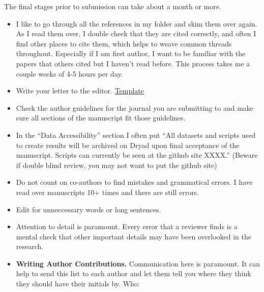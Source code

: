 \documentclass[
  letterpaper,
  DIV=11,
  numbers=noendperiod]{scrreprt}
\begin{document}

The final stages prior to submission can take about a month or more.

\begin{itemize}
\item
  I like to go through all the references in my folder and skim them
  over again. As I read them over, I double check that they are cited
  correctly, and often I find other places to cite them, which helps to
  weave common threads throughout. Especially if I am first author, I
  want to be familiar with the papers that others cited but I haven't
  read before. This process takes me a couple weeks of 4-5 hours per
  day.
\item
  Write your letter to the editor.
  \href{https://docs.google.com/document/d/1ye4hs0gYP4l4m27o9V_nPZqXD-EPNBrm9UWj-vBv_Zw/edit}{Template}
\item
  Check the author guidelines for the journal you are submitting to and
  make sure all sections of the manuscript fit those guidelines.
\item
  In the ``Data Accessibility'' section I often put ``All datasets and
  scripts used to create results will be archived on Dryad upon final
  acceptance of the manuscript. Scripts can currently be seen at the
  github site XXXX.'' (Beware if double blind review, you may not want
  to put the github site)
\item
  Do not count on co-authors to find mistakes and grammatical errors. I
  have read over manuscripts 10+ times and there are still errors.
\item
  Edit for unneccessary words or long sentences.
\item
  Attention to detail is paramount. Every error that a reviewer finds is
  a mental check that other important details may have been overlooked
  in the research.
\item
  \textbf{Writing Author Contributions.} Communication here is
  paramount. It can help to send this list to each author and let them
  tell you where they think they should have their initials by. Who:


\end{itemize}
\end{document}
